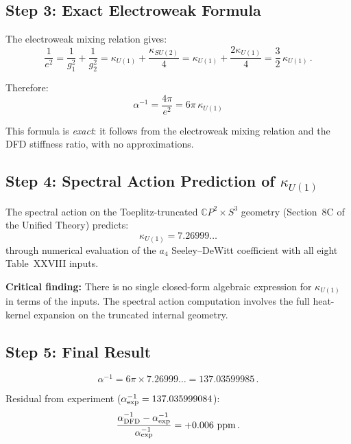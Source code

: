 \documentclass[12pt,a4paper]{article}
\begin{document}
\subsection{Step 3: Exact Electroweak Formula}

The electroweak mixing relation gives:
\begin{equation}
\frac{1}{e^2} = \frac{1}{g_1^2} + \frac{1}{g_2^2}
= \kappa_{U(1)} + \frac{\kappa_{SU(2)}}{4}
= \kappa_{U(1)} + \frac{2\kappa_{U(1)}}{4}
= \frac{3}{2}\,\kappa_{U(1)}\,.
\end{equation}

Therefore:
\begin{equation}
\boxed{\alpha^{-1} = \frac{4\pi}{e^2} = 6\pi\,\kappa_{U(1)}}
\end{equation}

This formula is \emph{exact}: it follows from the electroweak mixing
relation and the DFD stiffness ratio, with no approximations.

\subsection{Step 4: Spectral Action Prediction of $\kappa_{U(1)}$}

The spectral action on the Toeplitz-truncated $\mathbb{C}P^2 \times S^3$
geometry (Section~8C of the Unified Theory) predicts:
\begin{equation}
\kappa_{U(1)} = 7.26999\ldots
\end{equation}
through numerical evaluation of the $a_4$ Seeley--DeWitt coefficient
with all eight Table~XXVIII inputs.

\textbf{Critical finding:} There is no single closed-form algebraic
expression for $\kappa_{U(1)}$ in terms of the inputs.  The spectral
action computation involves the full heat-kernel expansion on the
truncated internal geometry.

\subsection{Step 5: Final Result}

\begin{equation}
\alpha^{-1} = 6\pi \times 7.26999\ldots = 137.03599985\,.
\end{equation}

Residual from experiment ($\alpha^{-1}_{\rm exp} = 137.035999084$):
\begin{equation}
\frac{\alpha^{-1}_{\rm DFD} - \alpha^{-1}_{\rm exp}}{\alpha^{-1}_{\rm exp}}
= +0.006\text{ ppm}\,.
\end{equation}
\end{document}
